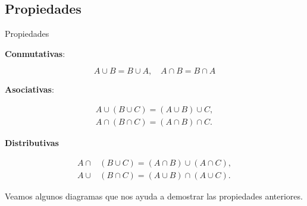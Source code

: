 \documentclass[
  letterpaper,
  DIV=11,
  numbers=noendperiod]{scrreprt}
\begin{document}
\subsection{Propiedades}\label{propiedades}

Propiedades

\textbf{Conmutativas}:

\[A\cup B=B\cup A, \quad A\cap B=B\cap A\]

\textbf{Asociativas}:

\begin{align*}
A\cup(B\cup C)=(A\cup B)\cup C, \\
A\cap(B\cap C)=(A\cap B)\cap C.
\end{align*}

\textbf{Distributivas}

\begin{align*}
A\cap & (B\cup C)=(A\cap B)\cup (A\cap C),\\ 
A\cup & (B\cap C)=(A\cup B)\cap (A\cup C).
\end{align*}

Veamos algunos diagramas que nos ayuda a demostrar las propiedades
anteriores.
\end{document}
